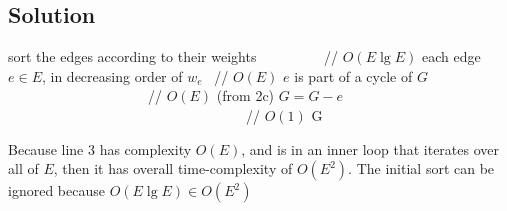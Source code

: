 \subsection*{Solution}

\begin{codebox}
\li sort the edges according to their weights \ \ \ \ \ \ \ \ \  // $O(E \lg E)$
\li \For each edge $e \in E$, in decreasing order of $w_e$ \    // $O(E)$
    \Then
    \li \If $e$ is part of a cycle of $G$  \ \ \ \ \ \ \ \ \ \ \ \ \ \ \ \ \ \ \ \    // $O(E)$ (from 2c)
        \Then
        \li $G = G - e$   \ \ \ \ \ \ \ \ \ \ \ \ \ \ \ \ \ \ \ \ \ \ \ \ \ \ \ \ \ \ \ \ \ \    // $O(1)$
        \End
    \End
\li \Return G
\end{codebox}

Because line 3 has complexity $O(E)$, and is in an inner loop that iterates over all of $E$, then it has overall time-complexity of $O(E^{2})$. The initial sort can be ignored because $O(E \lg E) \in O(E^{2})$
